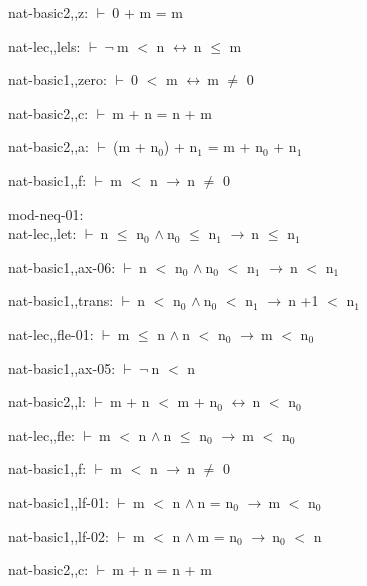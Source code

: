 \documentclass[a4paper]{article}
\newcommand{\Fol}{\mbox{$\vdash\ $}}
\newcommand{\Not}{\mbox{$\neg\ $}}
\newcommand{\And}{\mbox{$\wedge\ $}}
\newcommand{\Imp}{\mbox{$\rightarrow\ $}}
\newcommand{\Equiv}{\mbox{$\leftrightarrow\ $}}
\begin{document}
nat-basic2,,z: 
 \Fol 0 + m = m



nat-lec,,lels: 
 \Fol \Not m $<$ n \Equiv n $\le$ m



nat-basic1,,zero: 
 \Fol 0 $<$ m \Equiv m $\neq$ 0



nat-basic2,,c: 
 \Fol m + n = n + m



nat-basic2,,a: 
 \Fol (m + $\mbox{n}_{0}$) + $\mbox{n}_{1}$ = m + $\mbox{n}_{0}$ + $\mbox{n}_{1}$



nat-basic1,,f: 
 \Fol m $<$ n \Imp n $\neq$ 0



\bigskip

mod-neq-01:\\ nat-lec,,let: 
 \Fol n $\le$ $\mbox{n}_{0}$ \And $\mbox{n}_{0}$ $\le$ $\mbox{n}_{1}$ \Imp n $\le$ $\mbox{n}_{1}$



nat-basic1,,ax-06: 
 \Fol n $<$ $\mbox{n}_{0}$ \And $\mbox{n}_{0}$ $<$ $\mbox{n}_{1}$ \Imp n $<$ $\mbox{n}_{1}$



nat-basic1,,trans: 
 \Fol n $<$ $\mbox{n}_{0}$ \And $\mbox{n}_{0}$ $<$ $\mbox{n}_{1}$ \Imp n +1 $<$ $\mbox{n}_{1}$



nat-lec,,fle-01: 
 \Fol m $\le$ n \And n $<$ $\mbox{n}_{0}$ \Imp m $<$ $\mbox{n}_{0}$



nat-basic1,,ax-05: 
 \Fol \Not n $<$ n



nat-basic2,,l: 
 \Fol m + n $<$ m + $\mbox{n}_{0}$ \Equiv n $<$ $\mbox{n}_{0}$



nat-lec,,fle: 
 \Fol m $<$ n \And n $\le$ $\mbox{n}_{0}$ \Imp m $<$ $\mbox{n}_{0}$



nat-basic1,,f: 
 \Fol m $<$ n \Imp n $\neq$ 0



nat-basic1,,lf-01: 
 \Fol m $<$ n \And n = $\mbox{n}_{0}$ \Imp m $<$ $\mbox{n}_{0}$



nat-basic1,,lf-02: 
 \Fol m $<$ n \And m = $\mbox{n}_{0}$ \Imp $\mbox{n}_{0}$ $<$ n



nat-basic2,,c: 
 \Fol m + n = n + m
\end{document}
